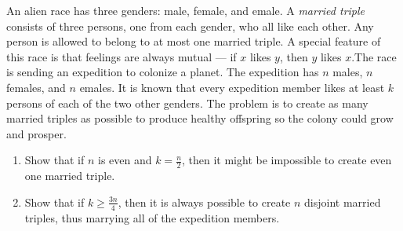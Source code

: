 \documentclass{article}
\begin{document}
\setlength{\parindent}{0pt}
An alien race has three genders: male, female, and emale. A \emph{married triple} consists of three persons, one from each gender, who all like each other. Any person is allowed to belong to at most one married triple. A special feature of this race is that feelings are always mutual — if $x$ likes $y$, then $y$ likes $x$.\newline The race is sending an expedition to colonize a planet. The expedition has $n$ males, $n$ females, and $n$ emales. It is known that every expedition member likes at least $k$ persons of each of the two other genders. The problem is to create as many married triples as possible to produce healthy offspring so the colony could grow and prosper.
\begin{enumerate}[label=\alph*)]
\item Show that if $n$ is even and $k=\frac n2$, then it might be impossible to create even one married triple.
\item Show that if $k\ge\frac{3n}{4}$, then it is always possible to create $n$ disjoint married triples, thus marrying all of the expedition members.
\end{enumerate}
\end{document}

